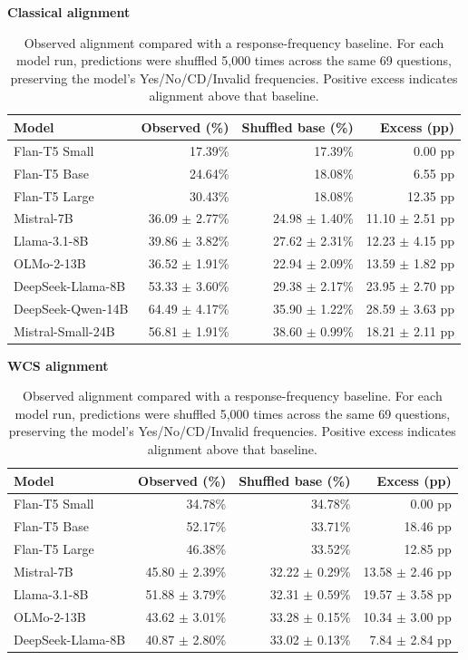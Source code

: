 \begin{table}[htbp]
\centering
\scriptsize
\setlength{\tabcolsep}{3pt}
\caption{Observed alignment compared with a response-frequency baseline. For each model run, predictions were shuffled 5,000 times across the same 69 questions, preserving the model's Yes/No/CD/Invalid frequencies. Positive excess indicates alignment above that baseline.}
\label{tab:response-bias-alignment}
\textbf{Classical alignment}
\begin{tabular}{lrrr}
\toprule
Model & Observed (\%) & Shuffled base (\%) & Excess (pp) \\
\midrule
Flan-T5 Small & 17.39\% & 17.39\% & 0.00 pp \\
Flan-T5 Base & 24.64\% & 18.08\% & 6.55 pp \\
Flan-T5 Large & 30.43\% & 18.08\% & 12.35 pp \\
Mistral-7B & 36.09 $\pm$ 2.77\% & 24.98 $\pm$ 1.40\% & 11.10 $\pm$ 2.51 pp \\
Llama-3.1-8B & 39.86 $\pm$ 3.82\% & 27.62 $\pm$ 2.31\% & 12.23 $\pm$ 4.15 pp \\
OLMo-2-13B & 36.52 $\pm$ 1.91\% & 22.94 $\pm$ 2.09\% & 13.59 $\pm$ 1.82 pp \\
DeepSeek-Llama-8B & 53.33 $\pm$ 3.60\% & 29.38 $\pm$ 2.17\% & 23.95 $\pm$ 2.70 pp \\
DeepSeek-Qwen-14B & 64.49 $\pm$ 4.17\% & 35.90 $\pm$ 1.22\% & 28.59 $\pm$ 3.63 pp \\
Mistral-Small-24B & 56.81 $\pm$ 1.91\% & 38.60 $\pm$ 0.99\% & 18.21 $\pm$ 2.11 pp \\
\bottomrule
\end{tabular}
\vspace{4pt}
\textbf{WCS alignment}
\begin{tabular}{lrrr}
\toprule
Model & Observed (\%) & Shuffled base (\%) & Excess (pp) \\
\midrule
Flan-T5 Small & 34.78\% & 34.78\% & 0.00 pp \\
Flan-T5 Base & 52.17\% & 33.71\% & 18.46 pp \\
Flan-T5 Large & 46.38\% & 33.52\% & 12.85 pp \\
Mistral-7B & 45.80 $\pm$ 2.39\% & 32.22 $\pm$ 0.29\% & 13.58 $\pm$ 2.46 pp \\
Llama-3.1-8B & 51.88 $\pm$ 3.79\% & 32.31 $\pm$ 0.59\% & 19.57 $\pm$ 3.58 pp \\
OLMo-2-13B & 43.62 $\pm$ 3.01\% & 33.28 $\pm$ 0.15\% & 10.34 $\pm$ 3.00 pp \\
DeepSeek-Llama-8B & 40.87 $\pm$ 2.80\% & 33.02 $\pm$ 0.13\% & 7.84 $\pm$ 2.84 pp \\

\end{tabular}
\end{table}
